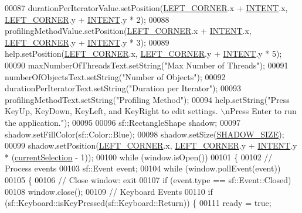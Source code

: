 \begin{DoxyCode}
00087     durationPerIteratorValue.setPosition(\hyperlink{main_8cpp_a532235d92b81b25e98dc2f260296c811}{LEFT\_CORNER}.x + \hyperlink{main_8cpp_a14d85091e46f0926119718516c204b46}{INTENT}.x, 
      \hyperlink{main_8cpp_a532235d92b81b25e98dc2f260296c811}{LEFT\_CORNER}.y + \hyperlink{main_8cpp_a14d85091e46f0926119718516c204b46}{INTENT}.y * 2);
00088     profilingMethodValue.setPosition(\hyperlink{main_8cpp_a532235d92b81b25e98dc2f260296c811}{LEFT\_CORNER}.x + \hyperlink{main_8cpp_a14d85091e46f0926119718516c204b46}{INTENT}.x, 
      \hyperlink{main_8cpp_a532235d92b81b25e98dc2f260296c811}{LEFT\_CORNER}.y + \hyperlink{main_8cpp_a14d85091e46f0926119718516c204b46}{INTENT}.y * 3);
00089     help.setPosition(\hyperlink{main_8cpp_a532235d92b81b25e98dc2f260296c811}{LEFT\_CORNER}.x, \hyperlink{main_8cpp_a532235d92b81b25e98dc2f260296c811}{LEFT\_CORNER}.y + \hyperlink{main_8cpp_a14d85091e46f0926119718516c204b46}{INTENT}.y * 5);
00090     maxNumberOfThreadsText.setString(\textcolor{stringliteral}{"Max Number of Threads"});
00091     numberOfObjectsText.setString(\textcolor{stringliteral}{"Number of Objects"});
00092     durationPerIteratorText.setString(\textcolor{stringliteral}{"Duration per Iterator"});
00093     profilingMethodText.setString(\textcolor{stringliteral}{"Profiling Method"});
00094     help.setString(\textcolor{stringliteral}{"Press KeyUp, KeyDown, KeyLeft, and KeyRight to edit settings. \(\backslash\)nPress Enter to run the
       application."});
00095     
00096     sf::RectangleShape shadow;
00097     shadow.setFillColor(sf::Color::Blue);
00098     shadow.setSize(\hyperlink{main_8cpp_ae7a422ac0192aae5609b1fd4202be5eb}{SHADOW\_SIZE});
00099     shadow.setPosition(\hyperlink{main_8cpp_a532235d92b81b25e98dc2f260296c811}{LEFT\_CORNER}.x, \hyperlink{main_8cpp_a532235d92b81b25e98dc2f260296c811}{LEFT\_CORNER}.y + 
      \hyperlink{main_8cpp_a14d85091e46f0926119718516c204b46}{INTENT}.y * (\hyperlink{main_8cpp_a0e589f9054cc1ee0716a7ecda74b1352}{currentSelection} - 1));
00100     \textcolor{keywordflow}{while} (window.isOpen())
00101     \{
00102         \textcolor{comment}{// Process events}
00103         sf::Event event;
00104         \textcolor{keywordflow}{while} (window.pollEvent(event))
00105         \{
00106             \textcolor{comment}{// Close window: exit}
00107             \textcolor{keywordflow}{if} (event.type == sf::Event::Closed)
00108                 window.close();
00109             \textcolor{comment}{// Keyboard Events}
00110             \textcolor{keywordflow}{if} (sf::Keyboard::isKeyPressed(sf::Keyboard::Return)) \{
00111                 ready = \textcolor{keyword}{true};

\end{DoxyCode}
